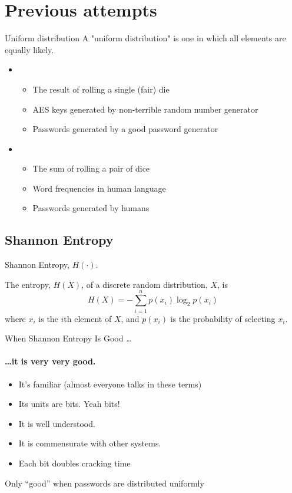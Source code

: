 \documentclass[xcolor={dvipsnames,table}]{beamer}
\newcommand\func[1]{\ensuremath{#1(\cdot)}}
\begin{document}
\section{Previous attempts}
\begin{frame}{Uniform distribution}
A "uniform distribution" is one in which all elements are equally likely.

\begin{itemize}
\item[Uniform]
 \begin{itemize}
 \pause
 \item The result of rolling a single (fair) die
 \pause
 \item AES keys generated by non-terrible random number generator
 \pause
 \item Passwords generated by a good password generator
 \end{itemize}

\item[Not]
 \begin{itemize}
 \pause
 \item The sum of rolling a pair of dice
 \pause
 \item Word frequencies in human language
 \pause
 \item Passwords generated by humans
 \end{itemize}
\end{itemize}
\end{frame}



\subsection{Shannon Entropy}

\begin{frame}{Shannon Entropy, \(\func{H}\).}
\begin{definition}
The entropy, $H(X)$, of a discrete random distribution, $X$, is
$$H(X) = -\sum_{i=1}^n p(x_i)\log_2p(x_i)$$
where $x_i$ is the $i$th element of $X$, and $p(x_i)$ is the probability of selecting $x_i$.
\end{definition}
\end{frame}

\begin{frame}{When Shannon Entropy Is Good \dots }
\framesubtitle{\dots it is very very good.}
\begin{itemize}
\pause
\item It's familiar (almost everyone talks in these terms)
\pause
\item Its units are bits. Yeah bits!
\pause
\item It is well understood.
\pause
\item It is commensurate with other systems.
\pause
\item Each bit doubles cracking time
\end{itemize}
\pause
\alert{Only ``good'' when passwords are distributed uniformly}
\end{frame}
\end{document}
